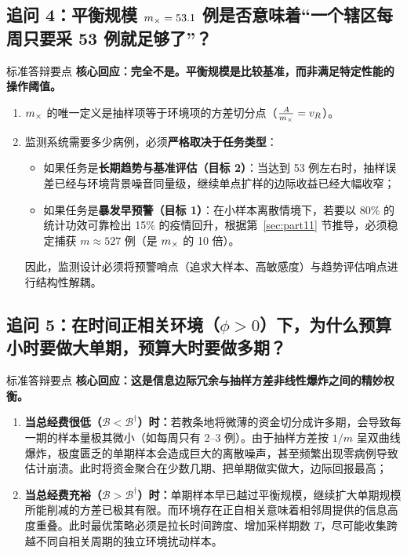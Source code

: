 \subsection{追问 4：平衡规模 $m_\times = 53.1$ 例是否意味着“一个辖区每周只要采 53 例就足够了”？}

\begin{derivationbox}{标准答辩要点}
\textbf{核心回应：完全不是。平衡规模是比较基准，而非满足特定性能的操作阈值。}
\begin{enumerate}
  \item $m_\times$ 的唯一定义是抽样项等于环境项的方差切分点（$\frac{A}{m_\times} = v_R$）。
  \item 监测系统需要多少病例，必须\textbf{严格取决于任务类型}：
  \begin{itemize}
    \item 如果任务是\textbf{长期趋势与基准评估（目标 2）}：当达到 53 例左右时，抽样误差已经与环境背景噪音同量级，继续单点扩样的边际收益已经大幅收窄；
    \item 如果任务是\textbf{暴发早预警（目标 1）}：在小样本离散情境下，若要以 80\% 的统计功效可靠检出 15\% 的疫情回升，根据第~\ref{sec:part11} 节推导，必须稳定捕获 $m \approx 527$ 例（是 $m_\times$ 的 10 倍）。
  \end{itemize}
  因此，监测设计必须将预警哨点（追求大样本、高敏感度）与趋势评估哨点进行结构性解耦。
\end{enumerate}
\end{derivationbox}

\subsection{追问 5：在时间正相关环境（$\phi > 0$）下，为什么预算小时要做大单期，预算大时要做多期？}

\begin{derivationbox}{标准答辩要点}
\textbf{核心回应：这是信息边际冗余与抽样方差非线性爆炸之间的精妙权衡。}
\begin{enumerate}
  \item \textbf{当总经费很低（$\mathcal{B} < \mathcal{B}^\dagger$）时：}若教条地将微薄的资金切分成许多期，会导致每一期的样本量极其微小（如每周只有 2--3 例）。由于抽样方差按 $1/m$ 呈双曲线爆炸，极度匮乏的单期样本会造成巨大的离散噪声，甚至频繁出现零病例导致估计崩溃。此时将资金聚合在少数几期、把单期做实做大，边际回报最高；
  \item \textbf{当总经费充裕（$\mathcal{B} > \mathcal{B}^\dagger$）时：}单期样本早已越过平衡规模，继续扩大单期规模所能削减的方差已极其有限。而环境存在正自相关意味着相邻周提供的信息高度重叠。此时最优策略必须是拉长时间跨度、增加采样期数 $T$，尽可能收集跨越不同自相关周期的独立环境扰动样本。
\end{enumerate}
\end{derivationbox}
